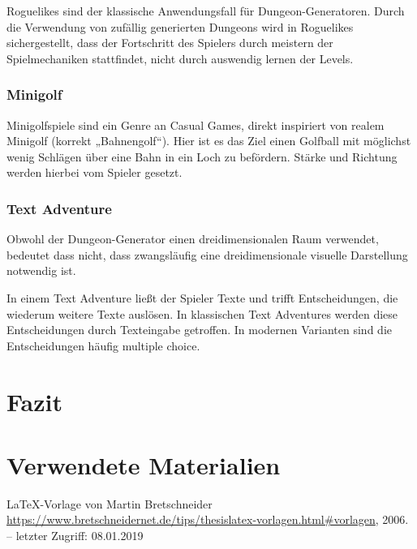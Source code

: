 Roguelikes sind der klassische Anwendungsfall für Dungeon-Generatoren. Durch die Verwendung von zufällig generierten Dungeons wird in Roguelikes sichergestellt, dass der Fortschritt des Spielers durch meistern der Spielmechaniken stattfindet, nicht durch auswendig lernen der Levels. 


\subsection{Minigolf}

Minigolfspiele sind ein Genre an Casual Games, direkt inspiriert von realem Minigolf (korrekt „Bahnengolf“). Hier ist es das Ziel einen Golfball mit möglichst wenig Schlägen über eine Bahn in ein Loch zu befördern. Stärke und Richtung werden hierbei vom Spieler gesetzt. 


\subsection{Text Adventure}

Obwohl der Dungeon-Generator einen dreidimensionalen Raum verwendet, bedeutet dass nicht, dass zwangsläufig eine dreidimensionale visuelle Darstellung notwendig ist.

In einem Text Adventure ließt der Spieler Texte und trifft Entscheidungen, die wiederum weitere Texte auslösen. In klassischen Text Adventures werden diese Entscheidungen durch Texteingabe getroffen. In modernen Varianten sind die Entscheidungen häufig multiple choice.



\chapter{Fazit}\label{c.zusammenfassung}



\chapter{Verwendete Materialien}

\LaTeX -Vorlage von Martin Bretschneider 
\newblock \url{https://www.bretschneidernet.de/tips/thesislatex-vorlagen.html#vorlagen}, 2006. --
\newblock letzter Zugriff: 08.01.2019

